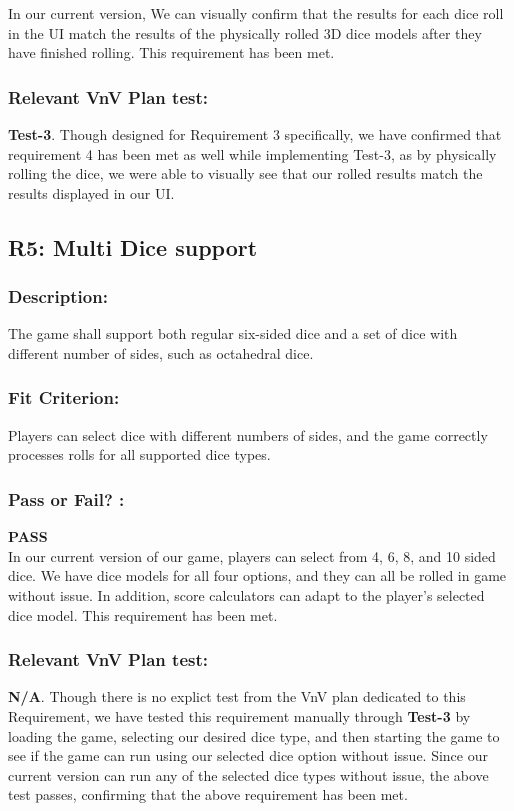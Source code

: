 \documentclass[12pt, titlepage]{article}
\begin{document}
 In our current version, We can visually confirm that the results for each dice roll in the UI match the results of the physically rolled 3D dice models after they have finished rolling. This requirement has been met.
 
  \subsubsection*{Relevant VnV Plan test: } \textbf{ Test-3}. Though designed for Requirement 3 specifically, we have confirmed that requirement 4 has been met as well while implementing Test-3, as by physically rolling the dice, we were able to visually see that our rolled results match the results displayed in our UI.
  
  
\subsection{R5: Multi Dice support} 
\label{R5} 

\subsubsection*{Description:}The game shall support both regular six-sided dice and a set of dice with different number of sides, such as octahedral dice.

\subsubsection*{Fit Criterion:} Players can select dice with different numbers of sides, and the game correctly processes rolls for all supported dice types.

\subsubsection*{Pass or Fail? :} 

 \noindent \textbf{PASS}\\
 
In our current version of our game, players can select from 4, 6, 8, and 10 sided dice. We have dice models for all four options, and they can all be rolled in game without issue. In addition, score calculators can adapt to the player's selected dice model. This requirement has been met.

\subsubsection*{Relevant VnV Plan test: } \textbf{N/A}. Though there is no explict test from the VnV plan dedicated to this Requirement, we have tested this requirement manually through \textbf{Test-3} by loading the game, selecting our desired dice type, and then starting the game to see if the game can run using our selected dice option without issue. Since our current version can run any of the selected dice types without issue, the above test passes, confirming that the above requirement has been met.
\end{document}
